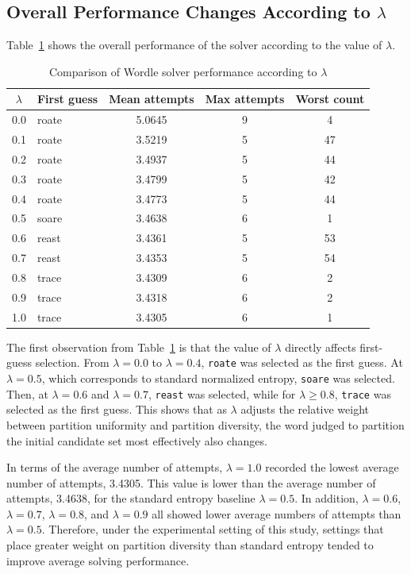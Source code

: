 \documentclass[11pt]{article}
\begin{document}
\subsection{Overall Performance Changes According to \texorpdfstring{$\lambda$}{lambda}}

Table~\ref{tab:lambda-sweep} shows the overall performance of the solver according to the value of $\lambda$.

\begin{table}[H]
\centering
\caption{Comparison of Wordle solver performance according to $\lambda$}
\label{tab:lambda-sweep}
\begin{tabular}{c l c c c}
\toprule
$\lambda$ & First guess & Mean attempts & Max attempts & Worst count \\
\midrule
0.0 & roate & 5.0645 & 9 & 4 \\
0.1 & roate & 3.5219 & 5 & 47 \\
0.2 & roate & 3.4937 & 5 & 44 \\
0.3 & roate & 3.4799 & 5 & 42 \\
0.4 & roate & 3.4773 & 5 & 44 \\
0.5 & soare & 3.4638 & 6 & 1 \\
0.6 & reast & 3.4361 & 5 & 53 \\
0.7 & reast & 3.4353 & 5 & 54 \\
0.8 & trace & 3.4309 & 6 & 2 \\
0.9 & trace & 3.4318 & 6 & 2 \\
1.0 & trace & 3.4305 & 6 & 1 \\
\bottomrule
\end{tabular}
\end{table}

The first observation from Table~\ref{tab:lambda-sweep} is that the value of $\lambda$ directly affects first-guess selection.
From $\lambda = 0.0$ to $\lambda = 0.4$, \texttt{roate} was selected as the first guess.
At $\lambda = 0.5$, which corresponds to standard normalized entropy, \texttt{soare} was selected.
Then, at $\lambda = 0.6$ and $\lambda = 0.7$, \texttt{reast} was selected, while for $\lambda \geq 0.8$, \texttt{trace} was selected as the first guess.
This shows that as $\lambda$ adjusts the relative weight between partition uniformity and partition diversity, the word judged to partition the initial candidate set most effectively also changes.

In terms of the average number of attempts, $\lambda = 1.0$ recorded the lowest average number of attempts, 3.4305.
This value is lower than the average number of attempts, 3.4638, for the standard entropy baseline $\lambda = 0.5$.
In addition, $\lambda = 0.6$, $\lambda = 0.7$, $\lambda = 0.8$, and $\lambda = 0.9$ all showed lower average numbers of attempts than $\lambda = 0.5$.
Therefore, under the experimental setting of this study, settings that place greater weight on partition diversity than standard entropy tended to improve average solving performance.
\end{document}
